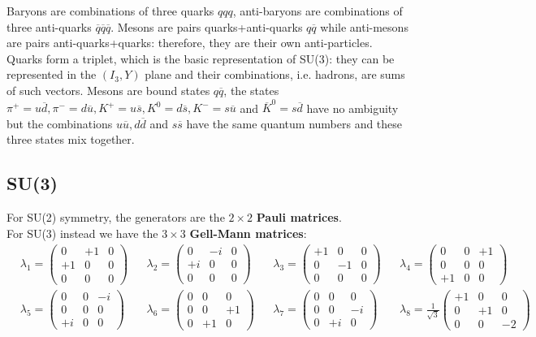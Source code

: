 \documentclass[10.75pt,a4paper,openright,bottom=2cm]{article}
\begin{document}
Baryons are combinations of three quarks $qqq$, anti-baryons are combinations of three anti-quarks $\overline{q}\overline{q}\overline{q}$. Mesons are pairs quarks+anti-quarks $q\overline{q}$ while anti-mesons are pairs anti-quarks+quarks: therefore, they are their own anti-particles.\\
Quarks form a triplet, which is the basic representation of SU(3): they can be represented in the $(I_3,Y)$ plane and their combinations, i.e. hadrons, are sums of such vectors. Mesons are bound states $q\overline{q}$, the states $\pi^+=u\overline{d}, \pi^-=d\overline{u}, K^+=u\overline{s}, K^0=d\overline{s}, K^-=s\overline{u}$ and $\overline{K}^0=s\overline{d}$ have no ambiguity but the combinations $u\overline{u}, d\overline{d}$ and $s\overline{s}$ have the same quantum numbers and these three states mix together. 
\subsection{SU(3)}
For SU(2) symmetry, the generators are the $2\times2$ \textbf{Pauli matrices}.\\
For SU(3) instead we have the $3\times3$ \textbf{Gell-Mann matrices}:
\[
\begin{aligned}
&\lambda_1 = \begin{pmatrix} 0 & +1 & 0 \\ +1 & 0 & 0 \\ 0 & 0 & 0 \end{pmatrix} &&\lambda_2 = \begin{pmatrix} 0 & -i & 0 \\ +i & 0 & 0 \\ 0 & 0 & 0 \end{pmatrix} &&\lambda_3 = \begin{pmatrix} +1 & 0 & 0 \\ 0 & -1 & 0 \\ 0 & 0 & 0 \end{pmatrix} &&\lambda_4 = \begin{pmatrix} 0 & 0 & +1 \\ 0 & 0 & 0 \\ +1 & 0 & 0 \end{pmatrix} \\
&\lambda_5 = \begin{pmatrix} 0 & 0 & -i \\ 0 & 0 & 0 \\ +i & 0 & 0 \end{pmatrix} &&\lambda_6 = \begin{pmatrix} 0 & 0 & 0 \\ 0 & 0 & +1 \\ 0 & +1 & 0 \end{pmatrix} &&\lambda_7 = \begin{pmatrix} 0 & 0 & 0 \\ 0 & 0 & -i \\ 0 & +i & 0 \end{pmatrix} &&\lambda_8 = \frac{1}{\sqrt{3}} \begin{pmatrix} +1 & 0 & 0 \\ 0 & +1 & 0 \\ 0 & 0 & -2 \end{pmatrix}
\end{aligned}
\]
\end{document}
